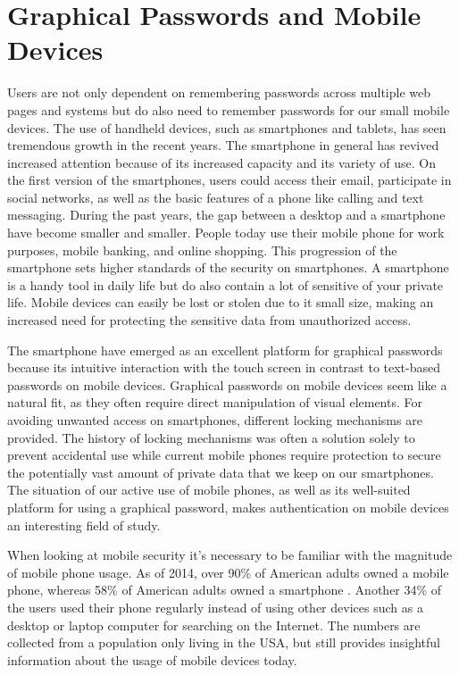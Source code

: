 \section{Graphical Passwords and Mobile Devices}\label{sec:pwmobiledevices}

  Users are not only dependent on remembering passwords across multiple web pages and systems but do also need to remember passwords for our small mobile devices. The use of handheld devices, such as smartphones and tablets, has seen tremendous growth in the recent years. The smartphone in general has revived increased attention because of its increased capacity and its variety of use. On the first version of the smartphones, users could access their email, participate in social networks, as well as the basic features of a phone like calling and text messaging. During the past years, the gap between a desktop and a smartphone have become smaller and smaller. People today use their mobile phone for work purposes, mobile banking, and online shopping. This progression of the smartphone sets higher standards of the security on smartphones. A smartphone is a handy tool in daily life but do also contain a lot of sensitive of your private life. Mobile devices can easily be lost or stolen due to it small size, making an increased need for protecting the sensitive data from unauthorized access.
  
  The smartphone have emerged as an excellent platform for graphical passwords because its intuitive interaction with the touch screen in contrast to text-based passwords on mobile devices. Graphical passwords on mobile devices seem like a natural fit, as they often require direct manipulation of visual elements. For avoiding unwanted access on smartphones, different locking mechanisms are provided. The history of locking mechanisms was often a solution solely to prevent accidental use while current mobile phones require protection to secure the potentially vast amount of private data that we keep on our smartphones. The situation of our active use of mobile phones, as well as its well-suited platform for using a graphical password, makes authentication on mobile devices an interesting field of study.

  When looking at mobile security it's necessary to be familiar with the magnitude of mobile phone usage. As of 2014, over 90\% of American adults owned a mobile phone, whereas 58\% of American adults owned a smartphone \cite{MobileUseage}. Another 34\% of the users used their phone regularly instead of using other devices such as a desktop or laptop computer for searching on the Internet. The numbers are collected from a population only living in the USA, but still provides insightful information about the usage of mobile devices today.

